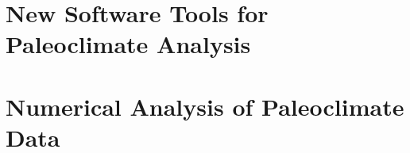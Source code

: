 \documentclass[
11pt, %
english, %
singlespacing, %
headsepline, %
]{MastersDoctoralThesis} %
\begin{document}



\tableofcontents %


\mainmatter %

\pagestyle{thesis} %




\part{New Software Tools for Paleoclimate Analysis}  \label{part:software}





\part{Numerical Analysis of Paleoclimate Data}  \label{part:numerics}







\cleardoublepage

\appendix %
\hypertarget{appendix}{\appendixpage}
\addappheadtotoc

\end{document}

